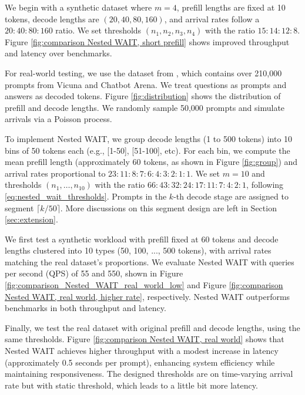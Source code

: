 We begin with a synthetic dataset where \( m=4 \), prefill lengths are fixed at 10 tokens, decode lengths are \( (20, 40, 80, 160) \), and arrival rates follow a \( 20:40:80:160 \) ratio. We set thresholds \( (n_1, n_2, n_3, n_4) \) with the ratio \( 15:14:12:8 \). Figure \ref{fig:comparison Nested WAIT, short prefill} shows improved throughput and latency over benchmarks.

For real-world testing, we use the dataset from \cite{zheng2023lmsys}, which contains over 210,000 prompts from Vicuna and Chatbot Arena. We treat questions as prompts and answers as decoded tokens. Figure \ref{fig:distribution} shows the distribution of prefill and decode lengths. We randomly sample 50,000 prompts and simulate arrivals via a Poisson process.

To implement Nested WAIT, we group decode lengths (1 to 500 tokens) into 10 bins of 50 tokens each (e.g., [1-50], [51-100], etc). For each bin, we compute the mean prefill length (approximately 60 tokens, as shown in Figure \ref{fig:group}) and arrival rates proportional to \( 23:11:8:7:6:4:3:2:1:1 \). We set \( m=10 \) and thresholds \( (n_1, \dots, n_{10}) \) with the ratio \( 66:43:32:24:17:11:7:4:2:1 \), following \eqref{eq:nested_wait_thresholds}. Prompts in the \( k \)-th decode stage are assigned to segment \( \lceil k/50 \rceil \). More discussions on this segment design are left in Section \ref{sec:extension}.

We first test a synthetic workload with prefill fixed at 60 tokens and decode lengths clustered into 10 types (50, 100, ..., 500 tokens), with arrival rates matching the real dataset's proportions. We evaluate Nested WAIT with queries per second (QPS) of 55 and 550, shown in Figure \ref{fig:comparison_Nested_WAIT_real_world_low} and Figure \ref{fig:comparison Nested WAIT, real world, higher rate}, respectively. Nested WAIT outperforms benchmarks in both throughput and latency.


Finally, we test the real dataset with original prefill and decode lengths, using the same thresholds. Figure \ref{fig:comparison Nested WAIT, real world} shows that Nested WAIT achieves higher throughput with a modest increase in latency (approximately 0.5 seconds per prompt), enhancing system efficiency while maintaining responsiveness. The designed thresholds are on time-varying arrival rate but with static threshold, which leads to a little bit more latency.

